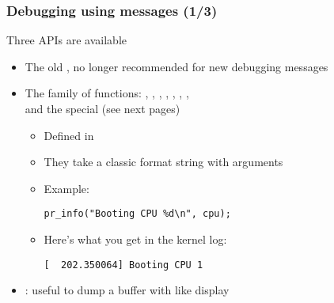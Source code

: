 \begin{frame}[fragile]
  \frametitle{Debugging using messages (1/3)}
  Three APIs are available
  \begin{itemize}
  \item The old , no longer recommended for new debugging
    messages
  \item The  family of functions: ,
    , , ,
    , , ,
     \\
    and the special  (see next pages)
    \begin{itemize}
    \item Defined in 
    \item They take a classic format string with arguments
    \item Example:
      \begin{verbatim}
pr_info("Booting CPU %d\n", cpu);
      \end{verbatim}
    \item Here's what you get in the kernel log:
      \begin{verbatim}
[  202.350064] Booting CPU 1
      \end{verbatim}
    \end{itemize}
    \item {}: useful to dump a buffer with
       like display
  \end{itemize}
\end{frame}

